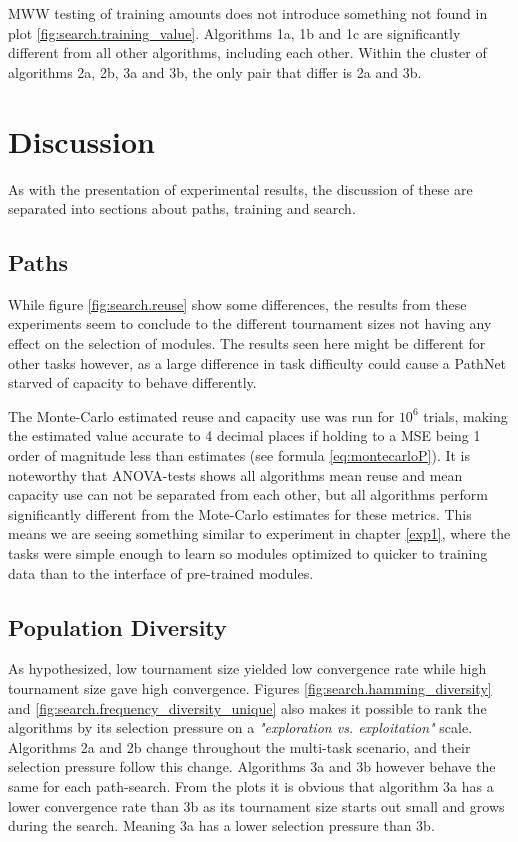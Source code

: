 MWW testing of training amounts does not introduce something not found in plot \ref{fig:search.training_value}. Algorithms 1a, 1b and 1c are significantly different from all other algorithms, including each other. Within the cluster of algorithms 2a, 2b, 3a and 3b, the only pair that differ is 2a and 3b. 

\section{Discussion}
As with the presentation of experimental results, the discussion of these are separated into sections about paths, training and search. 

\subsection{Paths}
While figure \ref{fig:search.reuse} show some differences, the results from these experiments seem to conclude to the different tournament sizes not having any effect on the selection of modules. The results seen here might be different for other tasks however, as a large difference in task difficulty could cause a PathNet starved of capacity to behave differently.

The Monte-Carlo estimated reuse and capacity use was run for \(10^{6}\) trials, making the estimated value accurate to 4 decimal places if holding to a MSE being 1 order of magnitude less than estimates (see formula \ref{eq:montecarloP}). It is noteworthy that ANOVA-tests shows all algorithms mean reuse and mean capacity use can not be separated from each other, but all algorithms perform significantly different from the Mote-Carlo estimates for these metrics. This means we are seeing something similar to experiment in chapter \ref{exp1}, where the tasks were simple enough to learn so modules optimized to quicker to training data than to the interface of pre-trained modules.   

\subsection{Population Diversity}
As hypothesized, low tournament size yielded low convergence rate while high tournament size gave high convergence. Figures \ref{fig:search.hamming_diversity} and \ref{fig:search.frequency_diversity_unique} also makes it possible to rank the algorithms by its selection pressure on a \textit{"exploration vs. exploitation"} scale. Algorithms 2a and 2b change throughout the multi-task scenario, and their selection pressure follow this change. Algorithms 3a and 3b however behave the same for each path-search. From the plots it is obvious that algorithm 3a has a lower convergence rate than 3b as its tournament size starts out small and grows during the search. Meaning 3a has a lower selection pressure than 3b. 

